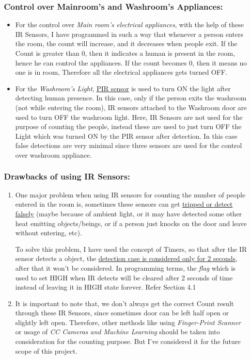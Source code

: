 \documentclass[11pt,a4paper]{article}
\begin{document}
\subsubsection{Control over Mainroom's and Washroom's Appliances:}
\begin{itemize}
\item For the control over \textit{Main room's electrical appliances}, with the help of these IR Sensors, I have programmed in such a way that whenever a person enters the room, the count will increase, and it decreases when people exit. If the Count is greater than 0, then it indicates a human is present in the room, hence he can control the appliances. If the count becomes 0, then it means no one is in room, Therefore all the electrical appliances gets turned OFF.

\item For the \textit{Washroom's Light}, \uline{PIR sensor} is used to turn ON the light after detecting human presence. In this case, only if the person exits the washroom (not while entering the room), IR sensors attached to the Washroom door are used to turn OFF the washroom light. Here, IR Sensors are not used for the purpose of counting the people, instead these are used to just turn OFF the Light which was turned ON by the PIR sensor after detection. In this case false detections are very minimal since three sensors are used for the control over washroom appliance.
\end{itemize}
\newpage

\subsubsection{Drawbacks of using IR Sensors:}
\begin{enumerate}
\item One major problem when using IR sensors for counting the number of people entered in the room is, sometimes these sensors can get \uline{tripped or detect falsely} (maybe because of ambient light, or it may have detected some other heat emitting objects/beings, or if a person just knocks on the door and leave without entering, etc). 

To solve this problem, I have used the concept of Timers, so that after the IR sensor detects a object, the \uline{detection case is considered only for 2 seconds}, after that it won't be considered. In programming terms, the \textit{flag} which is used to set HIGH when IR detects will be cleared after 2 seconds of time instead of leaving it in HIGH state forever. Refer Section 4.1

\item It is important to note that, we don't always get the correct Count result through these IR Sensors, since sometimes door can be left half open or slightly left open. Therefore, other methods like using \textit{Finger-Print Scanner} or usage of \textit{CC Cameras and Machine Learning} should be taken into consideration for the counting purpose. But I've considered it for the future scope of this project.
\end{enumerate} 
\end{document}
